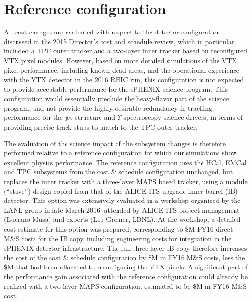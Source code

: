 \section{Reference configuration}

All cost changes are evaluated with respect to the detector
configuration discussed in the 2015 Director's cost and schedule
review, which in particular included a TPC outer tracker and a
two-layer inner tracker based on reconfigured VTX pixel
modules. However, based on more detailed simulations of the VTX pixel
performance, including known dead areas, and the operational
experience with the VTX detector in the 2016 RHIC run, this
configuration is not expected to provide acceptable performance for
the sPHENIX science program. This configuration would essentially
preclude the heavy-flavor part of the science program, and not provide
the highly desirable redundancy in tracking performance for the jet
structure and $\Upsilon$ spectroscopy science drivers, in terms of
providing precise track stubs to match to the TPC outer tracker.

The evaluation of the science impact of the subsystem changes is
therefore performed relative to a reference configuration for which
our simulations show excellent physics performance. The reference
configuration uses the HCal, EMCal and TPC subsystems from the cost \&
schedule configuration unchanged, but replaces the inner tracker with
a three-layer MAPS based tracker, using a module (``stave'') design
copied from that of the ALICE ITS upgrade inner barrel (IB)
detector. This option was extensively evaluated in a workshop
organized by the LANL group in late March 2016, attended by ALICE ITS
project management (Luciano Musa) and experts (Leo Greiner, LBNL).  At
the workshop, a detailed cost estimate for this option was prepared,
corresponding to \${\threeLayerMAPS}M FY16 direct M\&S costs for the
IB copy, including engineering costs for integration in the sPHENIX
detector infrastructure.  The full three-layer IB copy therefore
increases the cost of the cost \& schedule configuration by
\${\threeLayerMAPS}M in FY16 M\&S costs, less the \${\noVTX}M that had
been allocated to reconfiguring the VTX pixels. A significant part of
the performance gain associated with the reference configuration could
already be realized with a two-layer MAPS configuration, estimated to be
\${\twoLayerMAPS}M in FY16 M\&S cost.

